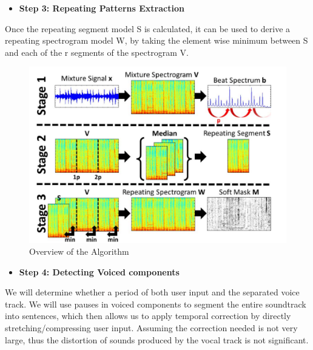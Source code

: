 \documentclass[journal,onecolumn, draftclsnofoot, 12pt]{IEEEtran}
\begin{document}
\vspace{0.5cm}
\begin{itemize}
    \item \textbf{Step 3: Repeating Patterns Extraction} 
\end{itemize}
\begin{description}
   Once the repeating segment model S is calculated, it can be used to derive a repeating spectrogram model W, by taking the element wise minimum between S and each of the r segments of the spectrogram V. 
\end{description}


\begin{figure}[ht]
\centering
\includegraphics[width=\textwidth]{Figure1.png}
    \caption{ Overview of the  Algorithm  } 

\end{figure}

\vspace{0.5cm}
\begin{itemize}
    \item \textbf{Step 4: Detecting Voiced components} 
\end{itemize}
\begin{description}
   We will determine whether a period of both user input and the separated voice track. We will use pauses in voiced components to segment the entire soundtrack into sentences, which then allows us to apply temporal correction by directly stretching/compressing user input. Assuming the correction needed is not very large, thus the distortion of sounds produced by the vocal track is not significant.
\end{description}
\end{document}
